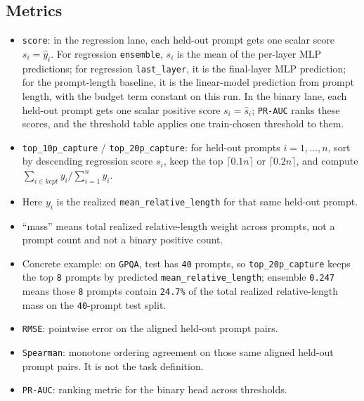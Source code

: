 \documentclass[11pt]{article}
\begin{document}
\subsection*{Metrics}
\begin{itemize}[leftmargin=1.5em]
\item \texttt{score}: in the regression lane, each held-out prompt gets one scalar score \texttt{$s_i = \hat y_i$}. For regression \texttt{ensemble}, \texttt{$s_i$} is the mean of the per-layer MLP predictions; for regression \texttt{last\_layer}, it is the final-layer MLP prediction; for the prompt-length baseline, it is the linear-model prediction from prompt length, with the budget term constant on this run. In the binary lane, each held-out prompt gets one scalar positive score \texttt{$s_i = \hat s_i$}; \texttt{PR-AUC} ranks these scores, and the threshold table applies one train-chosen threshold to them.
\item \texttt{top\_10p\_capture} / \texttt{top\_20p\_capture}: for held-out prompts \texttt{$i=1,\dots,n$}, sort by descending regression score \texttt{$s_i$}, keep the top \texttt{$\lceil 0.1n \rceil$} or \texttt{$\lceil 0.2n \rceil$}, and compute \texttt{$\sum_{i \in kept} y_i / \sum_{i=1}^n y_i$}.
\item Here \texttt{$y_i$} is the realized \texttt{mean\_relative\_length} for that same held-out prompt.
\item ``mass'' means total realized relative-length weight across prompts, not a prompt count and not a binary positive count.
\item Concrete example: on \texttt{GPQA}, test has \texttt{40} prompts, so \texttt{top\_20p\_capture} keeps the top \texttt{8} prompts by predicted \texttt{mean\_relative\_length}; ensemble \texttt{0.247} means those \texttt{8} prompts contain \texttt{24.7\%} of the total realized relative-length mass on the \texttt{40}-prompt test split.
\item \texttt{RMSE}: pointwise error on the aligned held-out prompt pairs.
\item \texttt{Spearman}: monotone ordering agreement on those same aligned held-out prompt pairs. It is not the task definition.
\item \texttt{PR-AUC}: ranking metric for the binary head across thresholds.
\end{itemize}
\end{document}
